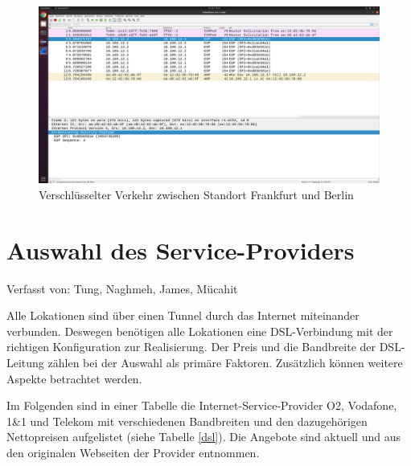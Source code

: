 \documentclass[fontsize=12pt,paper=a4,open=any,parskip=half,
  twoside=false,toc=listof,toc=bibliography,fleqn,leqno,
  captions=nooneline,captions=tableabove,british]{scrbook}
\begin{document}
\begin{figure}[H]
 \centering
 \includegraphics[width=1.0\textwidth]{Bilder/esp}
 \captionsetup{justification=centering}
 \caption{Verschlüsselter Verkehr zwischen Standort Frankfurt und Berlin}
 \label{esp}
\end{figure}


\section{Auswahl des Service-Providers}
{\tiny Verfasst von: Tung, Naghmeh, James, Mücahit\par}
Alle Lokationen sind über einen Tunnel durch das Internet miteinander verbunden. Deswegen benötigen alle Lokationen eine DSL-Verbindung mit der richtigen Konfiguration zur Realisierung. Der Preis und die Bandbreite der DSL-Leitung zählen bei der Auswahl als primäre Faktoren. Zusätzlich können weitere Aspekte betrachtet werden.\par 
Im Folgenden sind in einer Tabelle die Internet-Service-Provider O2, Vodafone, 1\&1 und Telekom mit verschiedenen Bandbreiten und den dazugehörigen Nettopreisen aufgelistet \cite{o2} \cite{vodafone} \cite{1u1} \cite{telekom} (siehe Tabelle \ref{dsl}). Die Angebote sind aktuell und aus den originalen Webseiten der Provider entnommen.
\end{document}
